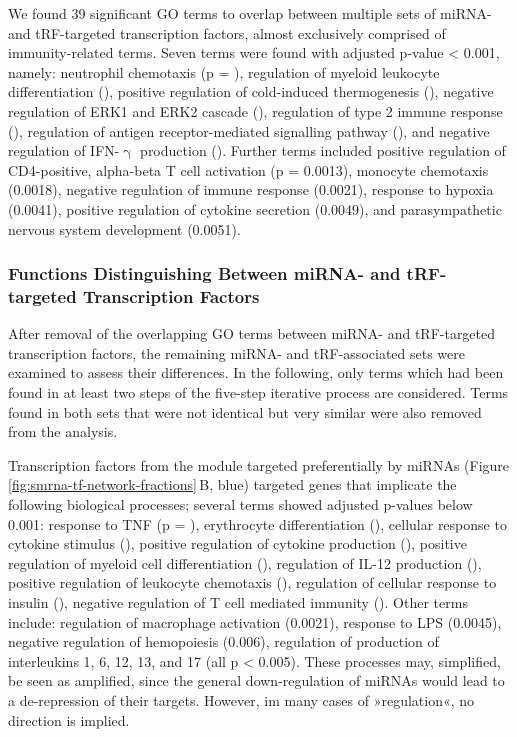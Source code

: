 We found 39 significant GO terms to overlap between multiple sets of miRNA- and tRF-targeted transcription factors, almost exclusively comprised of immunity-related terms. Seven terms were found with adjusted p-value < 0.001, namely: neutrophil chemotaxis (p = ), regulation of myeloid leukocyte differentiation (), positive regulation of cold-induced thermogenesis (), negative regulation of ERK1 and ERK2 cascade (), regulation of type 2 immune response (), regulation of antigen receptor-mediated signalling pathway (), and negative regulation of IFN-$\upgamma$ production (). Further terms included positive regulation of CD4-positive, alpha-beta T cell activation (p = 0.0013), monocyte chemotaxis (0.0018), negative regulation of immune response (0.0021), response to hypoxia (0.0041), positive regulation of cytokine secretion (0.0049), and parasympathetic nervous system development (0.0051).

\subsubsection{Functions Distinguishing Between miRNA- and tRF-targeted Transcription Factors}
After removal of the overlapping GO terms between miRNA- and tRF-targeted transcription factors, the remaining miRNA- and tRF-associated sets were examined to assess their differences. In the following, only terms which had been found in at least two steps of the five-step iterative process are considered. Terms found in both sets that were not identical but very similar were also removed from the analysis.

Transcription factors from the module targeted preferentially by miRNAs (Figure \ref{fig:smrna-tf-network-fractions}\,B, blue) targeted genes that implicate the following biological processes; several terms showed adjusted p-values below 0.001: response to TNF (p = ), erythrocyte differentiation (), cellular response to cytokine stimulus (), positive regulation of cytokine production (), positive regulation of myeloid cell differentiation (), regulation of IL-12 production (), positive regulation of leukocyte chemotaxis (), regulation of cellular response to insulin (), negative regulation of T cell mediated immunity (). Other terms include: regulation of macrophage activation (0.0021), response to LPS (0.0045), negative regulation of hemopoiesis (0.006), regulation of production of interleukins 1, 6, 12, 13, and 17 (all p < 0.005). These processes may, simplified, be seen as amplified, since the general down-regulation of miRNAs would lead to a de-repression of their targets. However, im many cases of »regulation«, no direction is implied.

